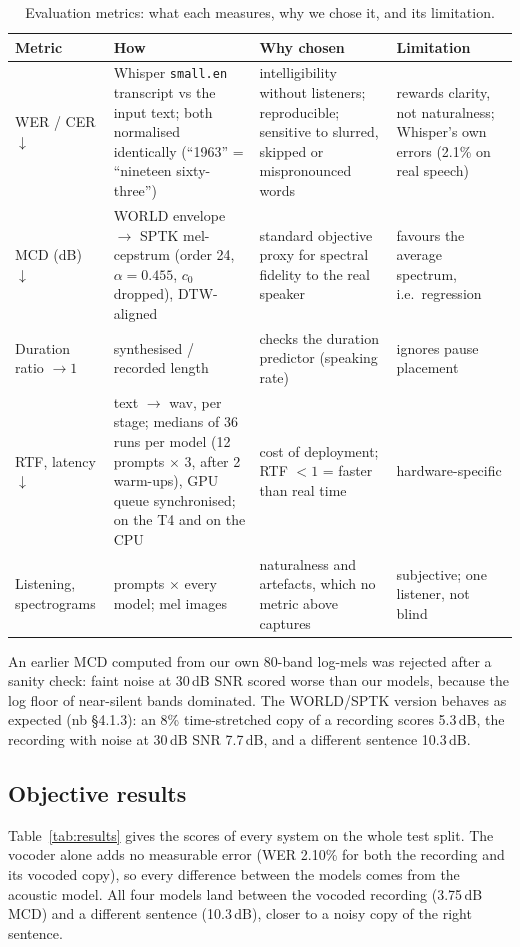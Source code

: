 \documentclass[11pt,a4paper]{article}
\begin{document}
\begin{table}[H]
\centering\small
\caption{Evaluation metrics: what each measures, why we chose it, and its limitation.}
\label{tab:metrics}
\begin{tabularx}{\linewidth}{@{}>{\raggedright\arraybackslash}p{2.1cm}>{\raggedright\arraybackslash}p{4.6cm}>{\raggedright\arraybackslash}X>{\raggedright\arraybackslash}p{3.3cm}@{}}
\toprule
Metric & How & Why chosen & Limitation \\ \midrule
WER / CER $\downarrow$ & Whisper \texttt{small.en} \citep{radford2022whisper} transcript vs the input text; both normalised identically (``1963'' = ``nineteen sixty-three'') & intelligibility without listeners; reproducible; sensitive to slurred, skipped or mispronounced words & rewards clarity, not naturalness; Whisper's own errors (2.1\% on real speech) \\
MCD (dB) $\downarrow$ & WORLD envelope $\rightarrow$ SPTK mel-cepstrum (order 24, $\alpha{=}0.455$, $c_0$ dropped), DTW-aligned \citep{kubichek1993mcd} & standard objective proxy for spectral fidelity to the real speaker & favours the average spectrum, i.e.\ regression \\
Duration ratio $\rightarrow 1$ & synthesised / recorded length & checks the duration predictor (speaking rate) & ignores pause placement \\
RTF, latency $\downarrow$ & text $\rightarrow$ wav, per stage; medians of 36 runs per model (12 prompts $\times$ 3, after 2 warm-ups), GPU queue synchronised; on the T4 and on the CPU & cost of deployment; RTF $<1$ = faster than real time & hardware-specific \\
Listening, spectrograms & 12 prompts $\times$ every model; mel images & naturalness and artefacts, which no metric above captures & subjective; one listener, not blind \\ \bottomrule
\end{tabularx}
\end{table}

\noindent An earlier MCD computed from our own 80-band log-mels was rejected after a sanity check: faint noise at 30\,dB SNR scored worse than our models, because the log floor of near-silent bands dominated. The WORLD/SPTK version behaves as expected (nb §4.1.3): an 8\% time-stretched copy of a recording scores 5.3\,dB, the recording with noise at 30\,dB SNR 7.7\,dB, and a different sentence 10.3\,dB.

\subsection{Objective results}
Table~\ref{tab:results} gives the scores of every system on the whole test split. The vocoder alone adds no measurable error (WER 2.10\% for both the recording and its vocoded copy), so every difference between the models comes from the acoustic model. All four models land between the vocoded recording (3.75\,dB MCD) and a different sentence (10.3\,dB), closer to a noisy copy of the right sentence.
\end{document}

